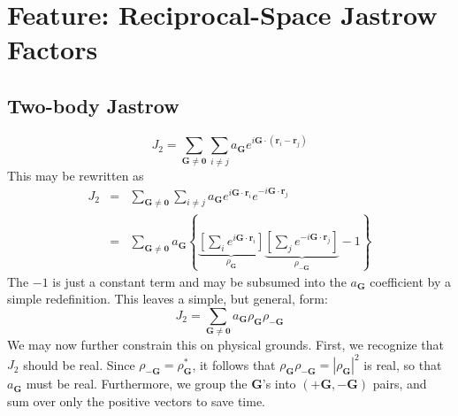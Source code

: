 \newpage
\section{Feature: Reciprocal-Space Jastrow Factors}
\label{sec:feature_kspace_jastrow}


\renewcommand{\vG}{\mathbf{G}}
\renewcommand{\vr}{\mathbf{r}}
\renewcommand{\vI}{\mathbf{I}}

\subsection{Two-body Jastrow}
\begin{equation}
J_2 = \sum_{\vG\neq \mathbf{0}}\sum_{i\neq j} a_\vG e^{i\vG\cdot(\vr_i-\vr_j)}
\end{equation}
This may be rewritten as
\begin{eqnarray}
J_2 & = & \sum_{\vG\neq \mathbf{0}}\sum_{i\neq j} a_\vG e^{i\vG\cdot\vr_i}e^{-i\vG\cdot\vr_j} \\
& = & \sum_{\vG\neq \mathbf{0}} a_\vG \left\{
\underbrace{\left[\sum_i e^{i\vG\cdot\vr_i} \right]}_{\rho_\vG}
\underbrace{\left[\sum_j e^{-i\vG\cdot\vr_j} \right]}_{\rho_{-\vG}}  -1 \right\}
\end{eqnarray}
The $-1$ is just a constant term and may be subsumed into the $a_\vG$
coefficient by a simple redefinition.  This leaves a simple, but
general, form:
\begin{equation}
J_2 = \sum_{\vG\neq\mathbf{0}} a_\vG \rho_\vG \rho_{-\vG}
\end{equation}
We may now further constrain this on physical grounds.  First, we
recognize that $J_2$ should be real.  Since $\rho_{-\vG} =
\rho_\vG^*$, it follows that $\rho_{\vG}\rho_{-\vG} = |\rho_\vG|^2$ is
real, so that $a_\vG$ must be real.  Furthermore, we group the $\vG$'s
into $(+\vG, -\vG)$ pairs, and sum over only the positive vectors to
save time.

